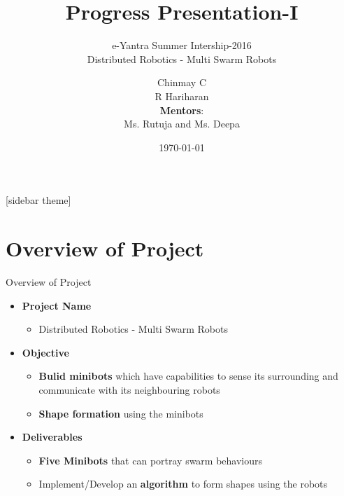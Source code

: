 \documentclass[10pt, a4paper]{beamer}
\begin{document}
	\title{Progress Presentation-I}
	\subtitle{e-Yantra Summer Intership-2016 \\ Distributed Robotics - Multi Swarm Robots}
	\author{Chinmay C\\R Hariharan\\
	\textbf{Mentors}:\\ Ms. Rutuja and Ms. Deepa}
	\date{\today}
	\frame{\titlepage}

[sidebar theme]
\section{Overview of Project}
\begin{frame}{Overview of Project}
	\begin{itemize}
		\setlength\itemsep{0em}
		\item \textbf{Project Name}
			\begin{itemize} 
				\setlength\itemsep{-1em}
				\item Distributed Robotics - Multi Swarm Robots
			\end{itemize}
		\item \textbf{Objective} 
			\begin{itemize}
				\setlength\itemsep{-0.7em}
				\item \textbf{Bulid minibots} which have capabilities to sense its surrounding and communicate with its neighbouring robots
				\item \textbf{Shape formation} using the minibots
			\end{itemize}
		\item \textbf{Deliverables}
			\begin{itemize}
				\setlength\itemsep{-0.7em}
				\item \textbf{Five Minibots} that can portray swarm behaviours 
				\item Implement/Develop an \textbf{algorithm} to form shapes using the robots
			\end{itemize}
	\end{itemize}
\end{frame}
\end{document}
